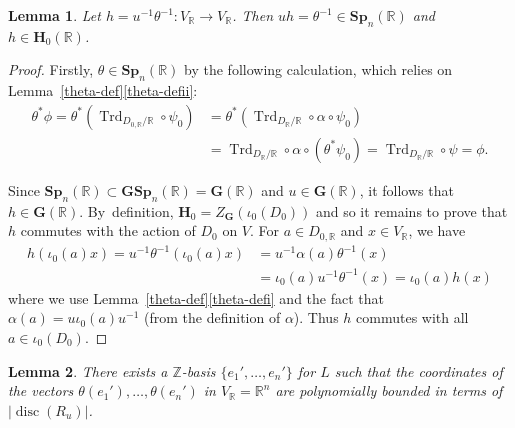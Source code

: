 \documentclass[JEP,XML,SOM,Unicode,NoFloatCountersInSection]{cedram}
\newcommand{\bR}{\mathbb{R}}
\newcommand{\bZ}{\mathbb{Z}}
\newcommand{\gG}{\mathbf{G}}
\newcommand{\gGSp}{\mathbf{GSp}}
\newcommand{\gH}{\mathbf{H}}
\newcommand{\gSp}{\mathbf{Sp}}
\DeclareMathOperator{\disc}{disc}
\DeclareMathOperator{\Trd}{Trd}
\newcommand{\abs}[1]{\lvert #1 \rvert}
\newtheorem{lemma}{Lemma}[section]
\begin{document}
\begin{lemma} \label{h-in-h0}
Let $h = u^{-1} \theta^{-1} \colon V_\bR \to V_\bR$.
Then $uh = \theta^{-1} \in \gSp_n(\bR)$ and $h \in \gH_0(\bR)$.
\end{lemma}

\begin{proof}
Firstly, $\theta \in \gSp_n(\bR)$ by the following calculation, which relies on Lem\-ma~\ref{theta-def}\eqref{theta-defii}:
\begin{align*}
\theta^* \phi
= \theta^*({\Trd_{D_{0,\bR}/\bR}} \circ \psi_0)
& = \theta^*({\Trd_{D_\bR/\bR}} \circ \alpha \circ \psi_0)
\\& = {\Trd_{D_\bR/\bR}} \circ \alpha \circ (\theta^* \psi_0)
= {\Trd_{D_\bR/\bR}} \circ \psi
= \phi.
\end{align*}

Since $\gSp_n(\bR) \!\subset\! \gGSp_n(\bR) = \gG(\bR)$ and $u \!\in\! \gG(\bR)$, it follows that $h \!\in\! \gG(\bR)$.
By~definition, $\gH_0 = Z_\gG(\iota_0(D_0))$ and so it remains to prove that $h$ commutes with the action of $D_0$ on $V$.
For $a \in D_{0,\bR}$ and $x \in V_\bR$, we have
\begin{align*}
h(\iota_0(a)x)
= u^{-1} \theta^{-1} (\iota_0(a)x)
& = u^{-1} \alpha(a) \theta^{-1}(x)
\\& = \iota_0(a) u^{-1} \theta^{-1}(x)
= \iota_0(a)h(x)
\end{align*}
where we use Lemma~\ref{theta-def}\eqref{theta-defi} and the fact that $\alpha(a) = u\iota_0(a)u^{-1}$ (from the definition of $\alpha$).
Thus $h$ commutes with all $a \in \iota_0(D_0)$.
\end{proof}

\begin{lemma} \label{z-basis-bound}
There exists a $\bZ$-basis $\{ e_1', \dotsc, e_n' \}$ for $L$ such that the coordinates of the vectors $\theta(e_1'), \dotsc, \theta(e_n')$ in $V_\bR = \bR^n$ are polynomially bounded in terms of $\abs{\disc(R_u)}$.
\end{lemma}
\end{document}
